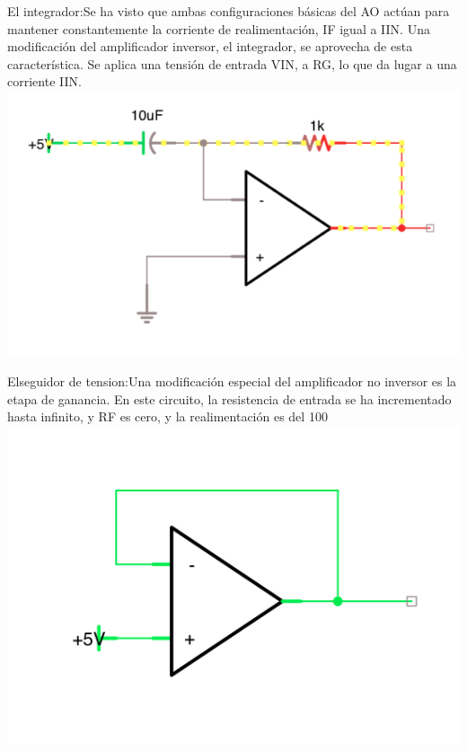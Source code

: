 \documentclass[12pt,a4paper]{article}
\begin{document}
\begin{flushleft}
El integrador:Se ha visto que ambas configuraciones básicas del AO actúan para mantener constantemente la corriente de realimentación, IF igual a IIN.
Una modificación del amplificador inversor, el integrador, se aprovecha de esta característica. Se aplica una tensión de entrada VIN, a RG, lo que da lugar a una corriente IIN.
\includegraphics[wedth=7cm]{6.png} 
\end{flushleft}
\begin{flushleft}
Elseguidor de tension:Una modificación especial del amplificador no inversor es la etapa de ganancia.
En este circuito, la resistencia de entrada se ha incrementado hasta infinito, y RF es cero, y la realimentación es del 100%
\includegraphics[wedth=7cm]{7.png} 
\end{flushleft}
\end{document}

